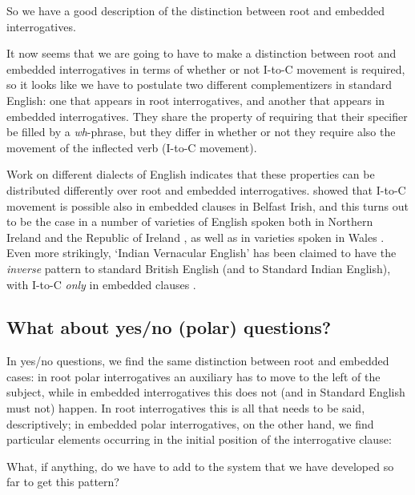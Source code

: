 \documentclass{article}
\begin{document}
So we have a good description of the distinction between root and embedded interrogatives.  


It now seems that we are going to have to make a distinction between root and embedded interrogatives in terms of whether or not I-to-C movement is required, so it looks like we have to postulate two different complementizers in standard English: one that appears in root interrogatives, and another that appears in embedded interrogatives.
They share the property of requiring that their specifier be filled by a \emph{wh}-phrase, but they differ in whether or not they require also the movement of the inflected verb (I-to-C movement).   

Work on different dialects of English indicates that these properties can be distributed differently over root and embedded interrogatives.
\citet{henry_belfast_1995} showed that I-to-C movement is possible also in embedded clauses in Belfast Irish, and this turns out to be the case in a number of varieties of English spoken both in Northern Ireland and the Republic of Ireland \citep{kirk_assessing_2007}, as well as in varieties spoken in Wales \citep{thomas_welsh_1985, penhallurick_welsh_2004}.
Even more strikingly, `Indian Vernacular English' has been claimed to have the \emph{inverse} pattern to standard British English (and to Standard Indian English), with I-to-C \emph{only} in embedded clauses \citep{bhatt_optimal_2000}.

\subsection{What about yes/no (polar) questions?}

In yes/no questions, we find the same distinction between root and embedded cases: in root polar interrogatives an auxiliary has to move to the left of the subject, while in embedded interrogatives this does not (and in Standard English must not) happen.
In root interrogatives this is all that needs to be said, descriptively;  in embedded polar interrogatives, on the other hand, we find particular elements  occurring in the initial position of the interrogative clause:
\begin{exe}
\end{exe}
What, if anything, do we have to add to the system that we have developed so far to get this pattern?
\end{document}
